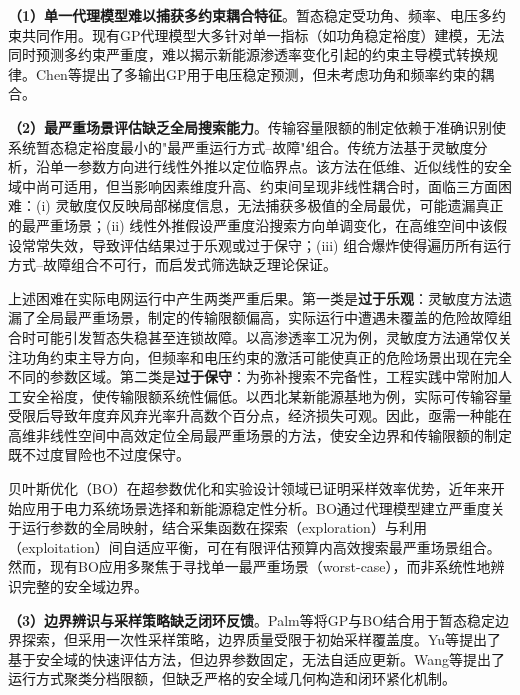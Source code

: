 \documentclass[a4paper,11pt]{ctexart}
\begin{document}
\textbf{（1）单一代理模型难以捕获多约束耦合特征}。暂态稳定受功角、频率、电压多约束共同作用\cite{hatziargyriou2020severity}。现有GP代理模型大多针对单一指标（如功角稳定裕度）建模\cite{ye2024parallel_gp}，无法同时预测多约束严重度，难以揭示新能源渗透率变化引起的约束主导模式转换规律\cite{murray2021voltage_control}。Chen等\cite{liu2020scalable_gp}提出了多输出GP用于电压稳定预测，但未考虑功角和频率约束的耦合。

\textbf{（2）最严重场景评估缺乏全局搜索能力}。传输容量限额的制定依赖于准确识别使系统暂态稳定裕度最小的"最严重运行方式--故障"组合。传统方法基于灵敏度分析\cite{hamilton2023shap_tsa}，沿单一参数方向进行线性外推以定位临界点。该方法在低维、近似线性的安全域中尚可适用，但当影响因素维度升高、约束间呈现非线性耦合时，面临三方面困难：(i) 灵敏度仅反映局部梯度信息，无法捕获多极值的全局最优，可能遗漏真正的最严重场景；(ii) 线性外推假设严重度沿搜索方向单调变化，在高维空间中该假设常常失效，导致评估结果过于乐观或过于保守；(iii) 组合爆炸使得遍历所有运行方式--故障组合不可行，而启发式筛选缺乏理论保证。

上述困难在实际电网运行中产生两类严重后果。第一类是\textbf{过于乐观}：灵敏度方法遗漏了全局最严重场景，制定的传输限额偏高，实际运行中遭遇未覆盖的危险故障组合时可能引发暂态失稳甚至连锁故障。以高渗透率工况为例，灵敏度方法通常仅关注功角约束主导方向，但频率和电压约束的激活可能使真正的危险场景出现在完全不同的参数区域。第二类是\textbf{过于保守}：为弥补搜索不完备性，工程实践中常附加人工安全裕度，使传输限额系统性偏低。以西北某新能源基地为例，实际可传输容量受限后导致年度弃风弃光率升高数个百分点，经济损失可观。因此，亟需一种能在高维非线性空间中高效定位全局最严重场景的方法，使安全边界和传输限额的制定既不过度冒险也不过度保守。

贝叶斯优化（BO）在超参数优化\cite{snoek2012practical}和实验设计领域已证明采样效率优势，近年来开始应用于电力系统场景选择\cite{bo2025der_scenarios, han2018surrogate_var}和新能源稳定性分析\cite{liu2020bayesian_security}。BO通过代理模型建立严重度关于运行参数的全局映射，结合采集函数在探索（exploration）与利用（exploitation）间自适应平衡，可在有限评估预算内高效搜索最严重场景组合\cite{frazier2018bo_tutorial}。然而，现有BO应用多聚焦于寻找单一最严重场景（worst-case），而非系统性地辨识完整的安全域边界。

\textbf{（3）边界辨识与采样策略缺乏闭环反馈}。Palm等\cite{palm2022gp_bo}将GP与BO结合用于暂态稳定边界探索，但采用一次性采样策略，边界质量受限于初始采样覆盖度。Yu等\cite{yu2020security_region}提出了基于安全域的快速评估方法，但边界参数固定，无法自适应更新。Wang等\cite{wang2021sparse_pce}提出了运行方式聚类分档限额，但缺乏严格的安全域几何构造和闭环紧化机制。
\end{document}
